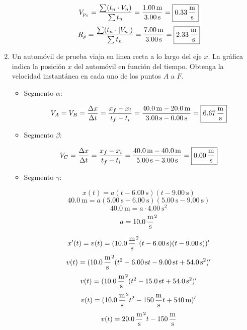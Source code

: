 \documentclass[Física - Práctica.root.tex]{subfiles}
\begin{document}
\begin{enumerate}
\begin{enumerate}
                \[
                  V_{p_x}
                  =\frac{\sum(t_n\cdot V_n)}{\sum t_n}
                  =\frac{\SI{1,00}{\meter}}{\SI{3,00}{\second}}
                  =\boxed{\SI{0,33}{\meter\over\second}}
                \]
                \[
                  R_p
                  =\frac{\sum(t_n\cdot |V_n|)}{\sum t_n}
                  =\frac{\SI{7,00}{\meter}}{\SI{3,00}{\second}}
                  =\boxed{\SI{2,33}{\meter\over\second}}
                \]
        \end{enumerate}

  \item Un automóvil de prueba viaja en linea recta a lo largo del eje $x$. La gráfica indica la posición $x$ del automóvil en función del tiempo. Obtenga la velocidad instantánea en cada uno de los puntos $A$ a $F$.

        \begin{itemize}
          \item Segmento $\alpha$:

                \[
                  V_A=V_B
                  =\frac{\Delta x}{\Delta t}
                  =\frac{x_f-x_i}{t_f-t_i}
                  =\frac{\SI{40,0}{\meter}-\SI{20,0}{\meter}}{\SI{3,00}{\second}-\SI{0,00}{\second}}
                  =\boxed{\SI{6,67}{\meter\over\second}}
                \]

          \item Segmento $\beta$:

                \[
                  V_C
                  =\frac{\Delta x}{\Delta t}
                  =\frac{x_f-x_i}{t_f-t_i}
                  =\frac{\SI{40,0}{\meter}-\SI{40,0}{\meter}}{\SI{5,00}{\second}-\SI{3,00}{\second}}
                  =\boxed{\SI{0,00}{\meter\over\second}}
                \]

          \item Segmento $\gamma$:

                \begin{multicols}{2}
                  \[x(t)=a(t-\SI{6,00}{\second})(t-\SI{9,00}{\second})\]
                  \[\SI{40,0}{\meter}=a(\SI{5,00}{\second}-\SI{6,00}{\second})(\SI{5,00}{\second}-\SI{9,00}{\second})\]
                  \[\SI{40,0}{\meter}=a\cdot\SI{4,00}{\second\squared}\]
                  \[a=\SI{10,0}{\meter\over\second\squared}\]

                  \[x'(t)=v(t)=(\SI{10,0}{\meter\over\second\squared}(t-\SI{6,00}{\second})(t-\SI{9,00}{\second}))'\]
                  \[v(t)=(\SI{10,0}{\meter\over\second\squared}(t^2-\SI{6,00}{\second}t-\SI{9,00}{\second}t+\SI{54,0}{\second\squared})'\]
                  \[v(t)=(\SI{10,0}{\meter\over\second\squared}(t^2-\SI{15,0}{\second}t+\SI{54,0}{\second\squared})'\]
                  \[v(t)=(\SI{10,0}{\meter\over\second\squared}t^2-\SI{150}{\meter\over\second}t+\SI{540}{\meter})'\]
                  \[v(t)=\SI{20,0}{\meter\over\second\squared}t-\SI{150}{\meter\over\second}\]


\end{multicols}
\end{itemize}
\end{enumerate}
\end{document}
